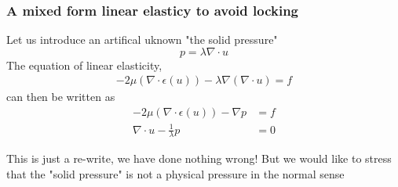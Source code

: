 \begin{frame}
\frametitle{A mixed form linear elasticy to avoid locking}

Let us introduce an artifical uknown "the solid pressure" 
\[
p = \lambda \nabla \cdot u 
\]
The equation of linear elasticity, 
\begin{align*}
-2 \mu (\nabla \cdot \epsilon (u)) - \lambda \nabla (\nabla \cdot u) = f
\end{align*}
can then be written as
\begin{align*}
\label{el:eq}
-2 \mu (\nabla \cdot \epsilon (u)) -\nabla p &= f \\
\nabla\cdot u - \frac{1}{\lambda} p &= 0  
\end{align*}

This is just a re-write, we have done nothing wrong! 
But we would like to stress that the "solid pressure" 
is not a physical pressure in the normal sense 

\end{frame}

